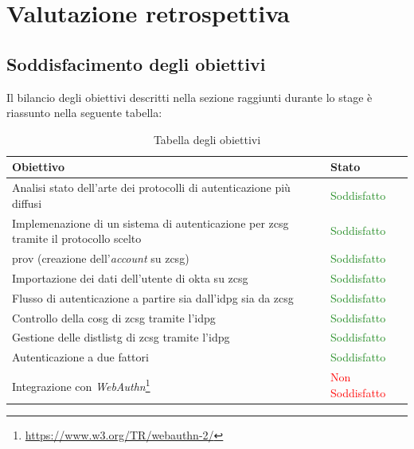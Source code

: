 
\chapter{Valutazione retrospettiva}
\label{cap:retrospettiva}

\section{Soddisfacimento degli obiettivi}
Il bilancio degli obiettivi descritti nella sezione  raggiunti durante lo stage è riassunto nella seguente tabella:

\begin{center}
    \begin{table}[h]
    \def\arraystretch{2}
    \begin{tabular}{|p{9cm}|p{3cm}|} %
        \hline
        \textbf{Obiettivo} & \textbf{Stato} \\ \hline  
         Analisi stato dell’arte dei protocolli di autenticazione più diffusi & \textcolor{ForestGreen}{Soddisfatto}\\ \hline
         Implemenazione di un sistema di autenticazione per \gls{zcsg} tramite il protocollo scelto & \textcolor{ForestGreen}{Soddisfatto}\\ \hline
         \gls{prov} (creazione dell'\textit{account} su \gls{zcsg})& \textcolor{ForestGreen}{Soddisfatto}\\ \hline
         Importazione dei dati dell’utente di \gls{okta} su \gls{zcsg} & \textcolor{ForestGreen}{Soddisfatto}\\ \hline
         Flusso di autenticazione a partire sia dall’\gls{idpg} sia da \gls{zcsg} & \textcolor{ForestGreen}{Soddisfatto}\\ \hline
         Controllo della \gls{cosg} di \gls{zcsg} tramite l’\gls{idpg} & \textcolor{ForestGreen}{Soddisfatto}\\ \hline
         Gestione delle \gls{distlistg} di \gls{zcsg} tramite l'\gls{idpg} & \textcolor{ForestGreen}{Soddisfatto}\\ \hline
         Autenticazione a due fattori & \textcolor{ForestGreen}{Soddisfatto}\\ \hline
         Integrazione con \textit{WebAuthn}\footnote{\url{https://www.w3.org/TR/webauthn-2/}} & \textcolor{Red}{Non Soddisfatto}\\ \hline
    \end{tabular}
    \caption{Tabella degli obiettivi}
    \end{table}
\end{center}

